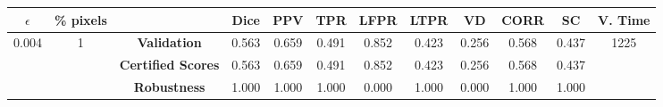 \begin{longtable}{ c  c | c | c  c  c  c  c  c  c c c}
\toprule \textbf{$\epsilon$} & \textbf{\% pixels} & & \textbf{Dice} & \textbf{PPV} & \textbf{TPR} & \textbf{LFPR} & \textbf{LTPR} & \textbf{VD} & \textbf{CORR} & \textbf{SC} & \textbf{V. Time} \\
\midrule 
\multirow{3}{*}{0.004}  & \multirow{3}{*}{1} &\textbf{Validation} & 0.563 & 0.659 & 0.491 & 0.852 & 0.423 & 0.256 & 0.568 & 0.437 & \multirow{3}{*}{1225} \\
 & & \textbf{Certified Scores} & 0.563 & 0.659 & 0.491 & 0.852 & 0.423 & 0.256 & 0.568 & 0.437 & \\
& & \textbf{Robustness} & 1.000 & 1.000 & 1.000 & 0.000 & 1.000 & 0.000 & 1.000 & 1.000 & \\
\end{longtable}